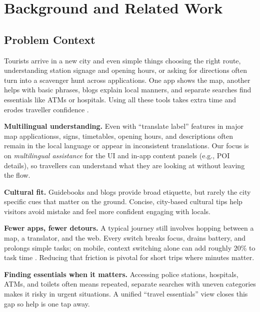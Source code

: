 \chapter{Background and Related Work}
\begin{sloppypar}

\section{Problem Context}
Tourists arrive in a new city and even simple things choosing the right route, understanding station signage and opening hours, or asking for directions often turn into a scavenger hunt across applications. One app shows the map, another helps with basic phrases, blogs explain local manners, and separate searches find essentials like ATMs or hospitals. Using all these tools takes extra time and erodes traveller confidence \cite{mobileit2024}.

\noindent \textbf{Multilingual understanding.}
Even with “translate label” features in major map applicationss, signs, timetables, opening hours, and descriptions often remain in the local language or appear in inconsistent translations. Our focus is on \emph{multilingual assistance} for the UI and in-app content panels (e.g., POI details), so travellers can understand what they are looking at without leaving the flow. 
\medskip

\noindent \textbf{Cultural fit.}
Guidebooks and blogs provide broad etiquette, but rarely the city specific cues that matter on the ground. Concise, city-based cultural tips help visitors avoid mistake and feel more confident engaging with locals.

\medskip

\noindent \textbf{Fewer apps, fewer detours.}
A typical journey still involves hopping between a map, a translator, and the web. Every switch breaks focus, drains battery, and prolongs simple tasks; on mobile, context switching alone can add roughly 20\% to task time \cite{mobileit2024}. Reducing that friction is pivotal for short trips where minutes matter.

\medskip

\noindent \textbf{Finding essentials when it matters.}
Accessing police stations, hospitals, ATMs, and toilets often means repeated, separate searches with uneven categories makes it risky in urgent situations. A unified “travel essentials” view closes this gap so help is one tap away.

\medskip


\end{sloppypar}
